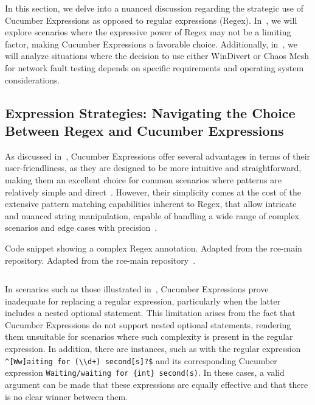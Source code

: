 In this section, we delve into a nuanced discussion regarding the strategic use of Cucumber Expressions as opposed to regular expressions (\ac{Regex}). In~, we will explore scenarios where the expressive power of \ac{Regex} may not be a limiting factor, making Cucumber Expressions a favorable choice. Additionally, in~, we will analyze situations where the decision to use either WinDivert or Chaos Mesh for network fault testing depends on specific requirements and operating system considerations.

\subsection{Expression Strategies: Navigating the Choice Between \ac{Regex} and Cucumber Expressions}
\label{subsec:expression-strategies}

As discussed in~, Cucumber Expressions offer several advantages in terms of their user-friendliness, as they are designed to be more intuitive and straightforward, making them an excellent choice for common scenarios where patterns are relatively simple and direct~\cite{githubGitHubCucumbercucumberexpressions}. However, their simplicity comes at the cost of the extensive pattern matching capabilities inherent to \ac{Regex}, that allow intricate and nuanced string manipulation, capable of handling a wide range of complex scenarios and edge cases with precision~\cite{githubGitHubCucumbercucumberexpressions}. 

\begin{listing}[!ht]
\caption{Code snippet showing a complex \ac{Regex} annotation. Adapted from the rce-main repository. Adapted from the rce-main repository~\cite{githubGitHubRcenvironmentrcemain}.}
\label{lst:complexRegex}
\inputminted[linenos, xleftmargin=2em]{java}{files/code/complexRegex.java}
\end{listing}

In scenarios such as those illustrated in~, Cucumber Expressions prove inadequate for replacing a regular expression, particularly when the latter includes a nested optional statement. This limitation arises from the fact that Cucumber Expressions do not support nested optional statements, rendering them unsuitable for scenarios where such complexity is present in the regular expression. In addition, there are instances, such as with the regular expression \verb|^[Ww]aiting for (\\d+) second[s]?$| and its corresponding Cucumber expression \verb|Waiting/waiting for {int} second(s)|. In these cases, a valid argument can be made that these expressions are equally effective and that there is no clear winner between them.

